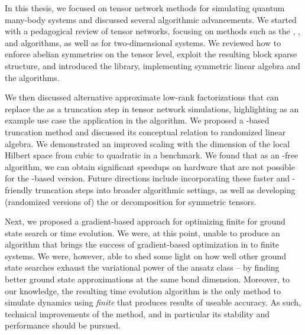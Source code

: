 In this thesis, we focused on tensor network methods for simulating quantum many-body systems and discussed several algorithmic advancements.
%
We started with a pedagogical review of tensor networks, focusing on  methods such as the , , and  algorithms, as well as  for two-dimensional systems.
%
We reviewed how to enforce abelian symmetries on the tensor level, exploit the resulting block sparse structure, and introduced the  library, implementing symmetric linear algebra and the  algorithms.

We then discussed alternative approximate low-rank factorizations that can replace the  as a truncation step in tensor network simulations, highlighting as an example use case the application in the  algorithm.
%
We proposed a -based truncation method and discussed its conceptual relation to randomized linear algebra.
%
We demonstrated an improved scaling with the dimension of the local Hilbert space from cubic to quadratic in a benchmark. We found that as an -free algorithm, we can obtain significant speedups on  hardware that are not possible for the -based version.
%
Future directions include incorporating these faster and -friendly truncation steps into broader algorithmic settings, as well as developing (randomized versions of) the  or  decomposition for symmetric tensors.



Next, we proposed a gradient-based approach for optimizing finite  for ground state search or time evolution.
%
We were, at this point, unable to produce an algorithm that brings the success of gradient-based optimization in  to finite systems.
%
We were, however, able to shed some light on how well other  ground state searches exhaust the variational power of the ansatz class -- by finding better ground state approximations at the same bond dimension.
%
Moreover, to our knowledge, the resulting time evolution algorithm is the only method to simulate dynamics using \emph{finite}  that produces results of useable accuracy.
%
As such, technical improvements of the method, and in particular its stability and performance should be pursued.



